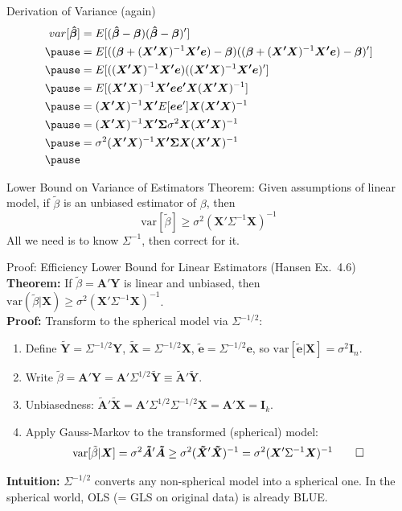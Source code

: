 \documentclass[aspectratio=169, handout]{beamer}
\numberwithin{equation}{section}
\begin{document}
\begin{frame}{Derivation of Variance (again)}
\begin{align*}
var[\bm{\hat{\beta}}]&=E[(\bm{\hat{\beta}}-\bm{\beta})(\bm{\hat{\beta}}-\bm{\beta})']\\ \pause
&=E[((\bm{\beta}+(\bm{X'X})^{-1}\bm{X'e})-\bm{\beta})((\bm{\beta}+(\bm{X'X})^{-1}\bm{X'e})-\bm{\beta})']\\ \pause
&=E[((\bm{X'X})^{-1}\bm{X'e})((\bm{X'X})^{-1}\bm{X'e})']\\ \pause
&=E[(\bm{X'X})^{-1}\bm{X'e}\bm{e'X}(\bm{X'X})^{-1}]\\ \pause
&=(\bm{X'X})^{-1}\bm{X'}E[\bm{e}\bm{e}']\bm{X}(\bm{X'X})^{-1}\\ \pause
&=(\bm{X'X})^{-1}\bm{X'}\bm{\Sigma}\sigma^2\bm{X}(\bm{X'X})^{-1}\\ \pause
&=\sigma^2(\bm{X'X})^{-1}\bm{X'}\bm{\Sigma}\bm{X}(\bm{X'X})^{-1}\\ \pause
\end{align*}
\end{frame}

\begin{frame}{Lower Bound on Variance of Estimators}
Theorem: Given assumptions of linear model, if $\tilde{\beta}$ is an unbiased estimator of $\beta$, then 
$$\text{var}[\tilde{\beta}]\geq\sigma^2(\bm{X}'\Sigma^{-1}\bm{X})^{-1}$$
All we need is to know $\Sigma^{-1}$, then correct for it.
\end{frame}

\begin{frame}{Proof: Efficiency Lower Bound for Linear Estimators (Hansen Ex.\ 4.6)}
\textbf{Theorem:} If $\tilde{\beta}=\bm{A'Y}$ is linear and unbiased, then $\text{var}(\tilde{\beta}|\bm{X})\geq \sigma^2(\bm{X}'\Sigma^{-1}\bm{X})^{-1}$.\\ \medskip\pause
\textbf{Proof:} Transform to the spherical model via $\Sigma^{-1/2}$:
\begin{enumerate}
\item Define $\bm{\tilde{Y}}=\Sigma^{-1/2}\bm{Y}$, $\bm{\tilde{X}}=\Sigma^{-1/2}\bm{X}$, $\bm{\tilde{e}}=\Sigma^{-1/2}\bm{e}$, so $\text{var}[\bm{\tilde{e}}|\bm{X}]=\sigma^2\bm{I}_n$.\pause
\item Write $\tilde{\beta}=\bm{A'Y}=\bm{A}'\Sigma^{1/2}\bm{\tilde{Y}}\equiv\bm{\tilde{A}}'\bm{\tilde{Y}}$.\pause
\item Unbiasedness: $\bm{\tilde{A}}'\bm{\tilde{X}}=\bm{A}'\Sigma^{1/2}\Sigma^{-1/2}\bm{X}=\bm{A'X}=\bm{I}_k$.\pause
\item Apply Gauss-Markov to the transformed (spherical) model:
$$\text{var}[\tilde{\beta}|\bm{X}]=\sigma^2\bm{\tilde{A}}'\bm{\tilde{A}}\geq \sigma^2(\bm{\tilde{X}}'\bm{\tilde{X}})^{-1}=\sigma^2(\bm{X}'\Sigma^{-1}\bm{X})^{-1} \qed$$
\end{enumerate}\pause
\medskip
\textbf{Intuition:} $\Sigma^{-1/2}$ converts any non-spherical model into a spherical one.  In the spherical world, OLS (= GLS on original data) is already BLUE.
\end{frame}
\end{document}
